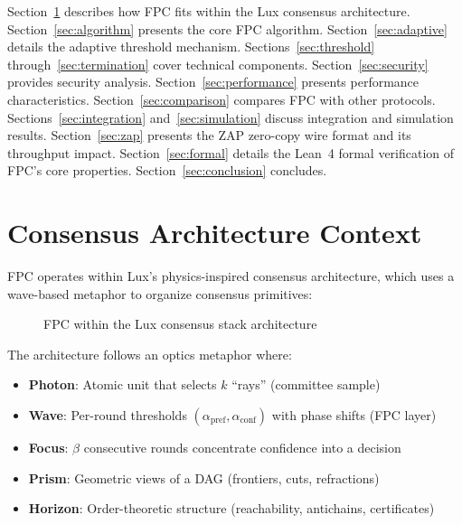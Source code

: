 \documentclass[11pt,a4paper]{article}
\begin{document}
Section~\ref{sec:architecture} describes how FPC fits within the Lux consensus architecture. Section~\ref{sec:algorithm} presents the core FPC algorithm. Section~\ref{sec:adaptive} details the adaptive threshold mechanism. Sections~\ref{sec:threshold} through~\ref{sec:termination} cover technical components. Section~\ref{sec:security} provides security analysis. Section~\ref{sec:performance} presents performance characteristics. Section~\ref{sec:comparison} compares FPC with other protocols. Sections~\ref{sec:integration} and~\ref{sec:simulation} discuss integration and simulation results. Section~\ref{sec:zap} presents the ZAP zero-copy wire format and its throughput impact. Section~\ref{sec:formal} details the Lean~4 formal verification of FPC's core properties. Section~\ref{sec:conclusion} concludes.

\section{Consensus Architecture Context}
\label{sec:architecture}

FPC operates within Lux's physics-inspired consensus architecture, which uses a wave-based metaphor to organize consensus primitives:

\begin{figure}[h]
\centering
{}
\caption{FPC within the Lux consensus stack architecture}
\label{fig:architecture}
\end{figure}

The architecture follows an optics metaphor where:
\begin{itemize}
\item \textbf{Photon}: Atomic unit that selects $k$ ``rays'' (committee sample)
\item \textbf{Wave}: Per-round thresholds $(\alpha_{\text{pref}}, \alpha_{\text{conf}})$ with phase shifts (FPC layer)
\item \textbf{Focus}: $\beta$ consecutive rounds concentrate confidence into a decision
\item \textbf{Prism}: Geometric views of a DAG (frontiers, cuts, refractions)
\item \textbf{Horizon}: Order-theoretic structure (reachability, antichains, certificates)
\end{itemize}
\end{document}
